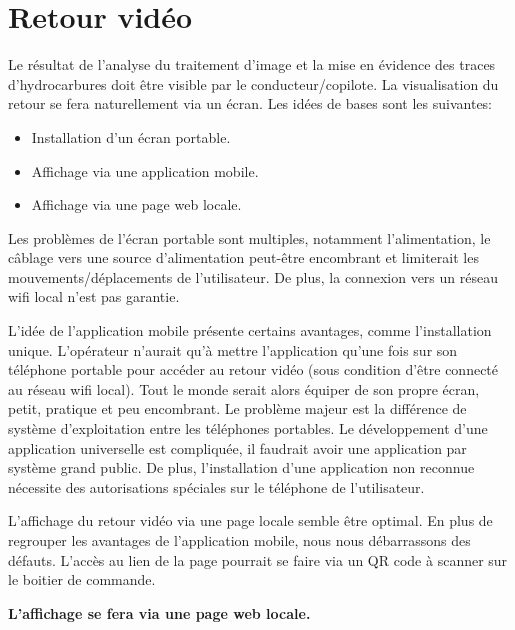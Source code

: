 \section{Retour vidéo}
Le résultat de l'analyse du traitement d'image et la mise en évidence des traces d'hydrocarbures doit être visible par le conducteur/copilote.
La visualisation du retour se fera naturellement via un écran. Les idées de bases sont les suivantes:
\begin{itemize}
    \item Installation d'un écran portable.
    \item Affichage via une application mobile.
    \item Affichage via une page web locale.
\end{itemize}

Les problèmes de l'écran portable sont multiples, notamment l'alimentation, le câblage vers une source d'alimentation peut-être encombrant
et limiterait les mouvements/déplacements de l'utilisateur. De plus, la connexion vers un réseau \Gls{wifi} local n'est pas garantie.

L'idée de l'application mobile présente certains avantages, comme l'installation unique. L'opérateur n'aurait qu'à mettre l'application
qu'une fois sur son téléphone portable pour accéder au retour vidéo (sous condition d'être connecté au réseau \Gls{wifi} local).
Tout le monde serait alors équiper de son propre écran, petit, pratique et peu encombrant. Le problème majeur est la différence de système d'exploitation
entre les téléphones portables. Le développement d'une application universelle est compliquée, il faudrait avoir une application par système grand public.
De plus, l'installation d'une application non reconnue nécessite des autorisations spéciales sur le téléphone de l'utilisateur.

L'affichage du retour vidéo via une page locale semble être optimal. En plus de regrouper les avantages de l'application mobile, nous nous débarrassons des défauts.
L'accès au lien de la page pourrait se faire via un QR code à scanner sur le boitier de commande.

\textbf{L'affichage se fera via une page web locale.}

